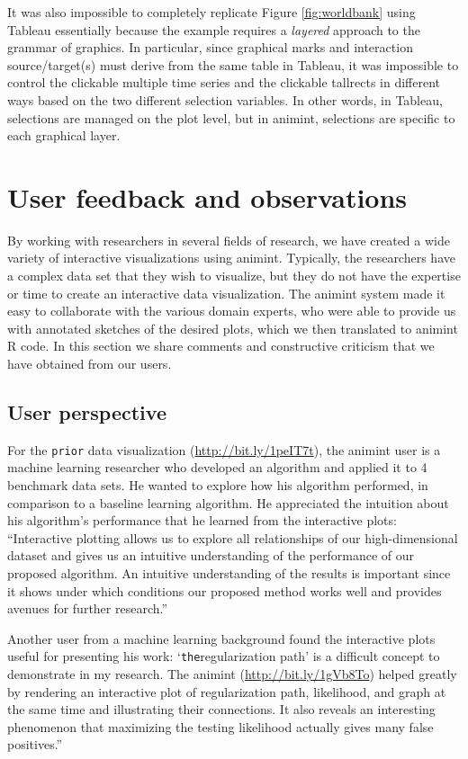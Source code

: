 \documentclass[12pt,]{isuthesis}
\begin{document}
It was also impossible to completely replicate Figure
\ref{fig:worldbank} using Tableau essentially because the example
requires a \emph{layered} approach to the grammar of graphics. In
particular, since graphical marks and interaction source/target(s) must
derive from the same table in Tableau, it was impossible to control the
clickable multiple time series and the clickable tallrects in different
ways based on the two different selection variables. In other words, in
Tableau, selections are managed on the plot level, but in animint,
selections are specific to each graphical layer.

\section{User feedback and observations}

By working with researchers in several fields of research, we have
created a wide variety of interactive visualizations using animint.
Typically, the researchers have a complex data set that they wish to
visualize, but they do not have the expertise or time to create an
interactive data visualization. The animint system made it easy to
collaborate with the various domain experts, who were able to provide us
with annotated sketches of the desired plots, which we then translated
to animint R code. In this section we share comments and constructive
criticism that we have obtained from our users.

\subsection{User perspective}

For the \texttt{prior} data visualization (\url{http://bit.ly/1peIT7t}),
the animint user is a machine learning researcher who developed an
algorithm and applied it to 4 benchmark data sets. He wanted to explore
how his algorithm performed, in comparison to a baseline learning
algorithm. He appreciated the intuition about his algorithm's
performance that he learned from the interactive plots: ``Interactive
plotting allows us to explore all relationships of our high-dimensional
dataset and gives us an intuitive understanding of the performance of
our proposed algorithm. An intuitive understanding of the results is
important since it shows under which conditions our proposed method
works well and provides avenues for further research.''

Another user from a machine learning background found the interactive
plots useful for presenting his work: `\texttt{the}regularization path'
is a difficult concept to demonstrate in my research. The animint
(\url{http://bit.ly/1gVb8To}) helped greatly by rendering an interactive
plot of regularization path, likelihood, and graph at the same time and
illustrating their connections. It also reveals an interesting
phenomenon that maximizing the testing likelihood actually gives many
false positives.''
\end{document}
